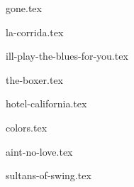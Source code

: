 \begin{songs}{}

  {gone.tex}
  \sclearpage

  {la-corrida.tex}
  \sclearpage

  {ill-play-the-blues-for-you.tex}
  \sclearpage

  {the-boxer.tex}
  \sclearpage

  {hotel-california.tex}
  \sclearpage

  {colors.tex}
  \sclearpage

  {aint-no-love.tex}
  \sclearpage
  
  {sultans-of-swing.tex}
  \sclearpage

 \end{songs}
